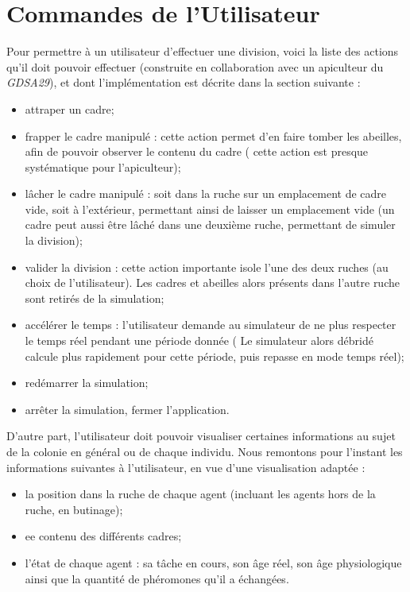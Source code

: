 		

	\section{Commandes de l'Utilisateur}
	
	Pour permettre à un utilisateur d'effectuer une division, voici la liste des actions qu'il doit pouvoir effectuer (construite en collaboration avec un apiculteur du \textit{GDSA29}), et dont l'implémentation est décrite dans la section suivante :
		\begin{itemize}
			\item attraper un cadre;
			\item frapper le cadre manipulé : cette action permet d'en faire tomber les abeilles, afin de pouvoir observer le contenu du cadre ( cette action est presque systématique pour l'apiculteur);
			\item lâcher le cadre manipulé : soit dans la ruche sur un emplacement de cadre vide, soit à l'extérieur, permettant ainsi de laisser un emplacement vide (un cadre peut aussi être lâché dans une deuxième ruche, permettant de simuler la division);
			\item valider la division : cette action importante isole l'une des deux ruches (au choix de l'utilisateur). Les cadres et abeilles alors présents dans l'autre ruche sont retirés de la simulation;
			\item accélérer le temps : l'utilisateur demande au simulateur de ne plus respecter le temps réel pendant une période donnée ( Le simulateur alors débridé calcule plus rapidement pour cette période, puis repasse en mode temps réel);
			\item redémarrer la simulation;
			\item arrêter la simulation, fermer l'application.
		\end{itemize}	
		
		D'autre part, l'utilisateur doit pouvoir visualiser certaines informations au sujet de la colonie en général ou de chaque individu. Nous remontons pour l'instant les informations suivantes à l'utilisateur, en vue d'une visualisation adaptée :
		\begin{itemize}
			\item la position dans la ruche de chaque agent (incluant les agents hors de la ruche, en butinage);
			\item ee contenu des différents cadres;
			\item l'état de chaque agent : sa tâche en cours, son âge réel, son âge physiologique ainsi que la quantité de phéromones qu'il a échangées.
		\end{itemize}		

